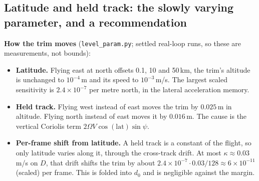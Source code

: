 \documentclass[11pt]{article}
\begin{document}
\subsection{Latitude and held track: the slowly varying parameter, and a recommendation}\label{sec:levelparam}

\textbf{How the trim moves} (\texttt{level\_param.py}; settled real-loop runs, so these are measurements, not bounds):
\begin{itemize}
\item \textbf{Latitude.} Flying east at north offsets 0.1, 10 and 50\,km, the trim's altitude is unchanged to $10^{-4}$\,m and its speed to $10^{-3}$\,m/s. The largest scaled sensitivity is $2.4\times10^{-7}$ per metre north, in the lateral acceleration memory.
\item \textbf{Held track.} Flying west instead of east moves the trim by $0.025$\,m in altitude. Flying north instead of east moves it by $0.016$\,m. The cause is the vertical Coriolis term $2\Omega V\cos(\text{lat})\sin\psi$.
\item \textbf{Per-frame shift from latitude.} A held track is a constant of the flight, so only latitude varies along it, through the cross-track drift. At most $\kappa \approx 0.03$\,m/s on $D$, that drift shifts the trim by about $2.4\times10^{-7}\cdot 0.03 / 128 \approx 6\times10^{-11}$ (scaled) per frame. This is folded into $d_0$ and is negligible against the margin.
\end{itemize}
\end{document}
